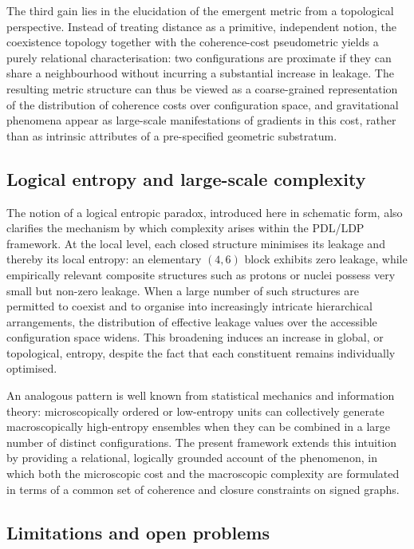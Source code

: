 \documentclass[11pt,a4paper]{article}
\theoremstyle{definition}
\begin{document}
The third gain lies in the elucidation of the emergent metric from a topological perspective. Instead of treating distance as a primitive, independent notion, the coexistence topology together with the coherence-cost pseudometric yields a purely relational characterisation: two configurations are proximate if they can share a neighbourhood without incurring a substantial increase in leakage. The resulting metric structure can thus be viewed as a coarse-grained representation of the distribution of coherence costs over configuration space, and gravitational phenomena appear as large-scale manifestations of gradients in this cost, rather than as intrinsic attributes of a pre-specified geometric substratum.

\subsection{Logical entropy and large-scale complexity}

The notion of a logical entropic paradox, introduced here in schematic form, also clarifies the mechanism by which complexity arises within the PDL/LDP framework. At the local level, each closed structure minimises its leakage and thereby its local entropy: an elementary \((4,6)\) block exhibits zero leakage, while empirically relevant composite structures such as protons or nuclei possess very small but non-zero leakage. When a large number of such structures are permitted to coexist and to organise into increasingly intricate hierarchical arrangements, the distribution of effective leakage values over the accessible configuration space widens. This broadening induces an increase in global, or topological, entropy, despite the fact that each constituent remains individually optimised.

An analogous pattern is well known from statistical mechanics and information theory: microscopically ordered or low-entropy units can collectively generate macroscopically high-entropy ensembles when they can be combined in a large number of distinct configurations. The present framework extends this intuition by providing a relational, logically grounded account of the phenomenon, in which both the microscopic cost and the macroscopic complexity are formulated in terms of a common set of coherence and closure constraints on signed graphs.

\subsection{Limitations and open problems}
\end{document}
